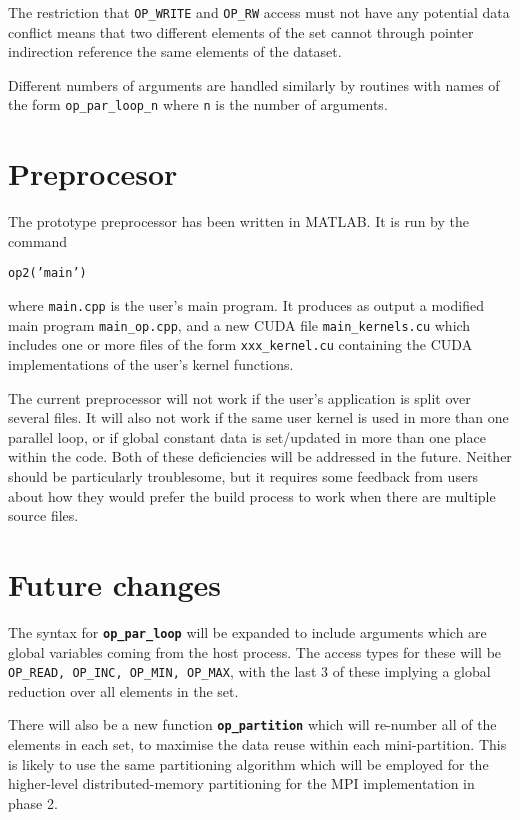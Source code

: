 The restriction that {\tt OP\_WRITE} and {\tt OP\_RW} access must not have any 
potential data conflict means that two different elements of the set cannot 
through pointer indirection reference the same elements of the dataset.  


Different numbers of arguments are handled similarly by routines with names
of the form {\tt op\_par\_loop\_n} where {\tt n} is the number of arguments.

\newpage
\section{Preprocesor}

The prototype preprocessor has been written in MATLAB.  It is run by the command

{\tt op2('main')}

\noindent
where {\tt main.cpp} is the user's main program.  It produces as output a 
modified main program {\tt main\_op.cpp}, and a new CUDA file {\tt main\_kernels.cu}
which includes one or more files of the form {\tt xxx\_kernel.cu} containing 
the CUDA implementations of the user's kernel functions.

The current preprocessor will not work if the user's application is split over 
several files.  It will also not work if the same user kernel is used in more 
than one parallel loop, or if global constant data is set/updated in more than 
one place within the code.
Both of these deficiencies will be addressed in the future.  Neither should be 
particularly troublesome, but it requires some feedback from users about how
they would prefer the build process to work when there are multiple source files.


\section{Future changes}

The syntax for {\tt \bf op\_par\_loop} will be expanded to include arguments 
which are global variables coming from the host process.  The access types for
these will be {\tt OP\_READ, OP\_INC, OP\_MIN, OP\_MAX}, with the last 3 of these
implying a global reduction over all elements in the set.

There will also be a new function {\tt \bf op\_partition} which will re-number 
all of the elements in each set, to maximise the data reuse within each 
mini-partition.  This is likely to use the same partitioning algorithm which
will be employed for the higher-level distributed-memory partitioning for the
MPI implementation in phase 2.






